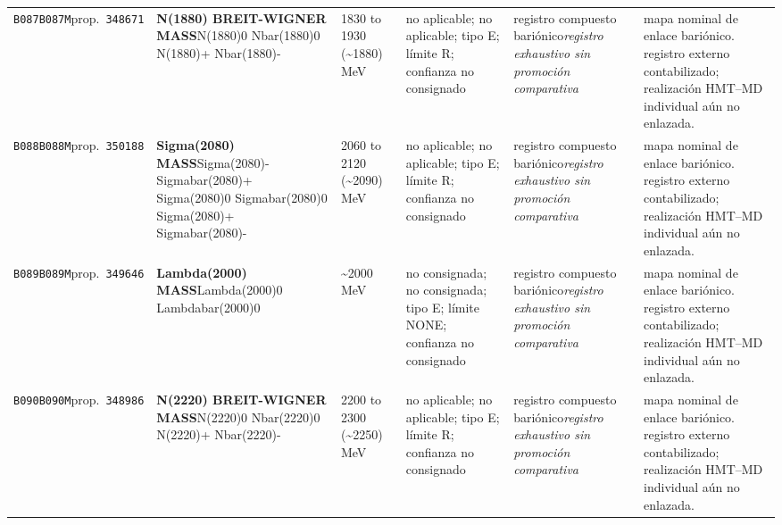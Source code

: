 \begin{landscape}
\begin{longtable}{L{1.85cm}L{4.45cm}L{2.35cm}L{4.05cm}L{3.35cm}L{7.15cm}}
\texttt{B087}\newline \texttt{B087M}\newline prop.\ \texttt{348671} & \textbf{N(1880) BREIT-WIGNER MASS}\newline N(1880)0 \textbar{}\allowbreak{} Nbar(1880)0 \textbar{}\allowbreak{} N(1880)+ \textbar{}\allowbreak{} Nbar(1880)- & 1830 to 1930 (\textasciitilde{}1880)\,MeV & no aplicable; no aplicable; tipo E; límite R; confianza no consignado & registro compuesto bariónico\newline \emph{registro exhaustivo sin promoción comparativa} & mapa nominal de enlace bariónico. registro externo contabilizado; realización HMT--MD individual aún no enlazada. \\
\texttt{B088}\newline \texttt{B088M}\newline prop.\ \texttt{350188} & \textbf{Sigma(2080) MASS}\newline Sigma(2080)- \textbar{}\allowbreak{} Sigmabar(2080)+ \textbar{}\allowbreak{} Sigma(2080)0 \textbar{}\allowbreak{} Sigmabar(2080)0 \textbar{}\allowbreak{} Sigma(2080)+ \textbar{}\allowbreak{} Sigmabar(2080)- & 2060 to 2120 (\textasciitilde{}2090)\,MeV & no aplicable; no aplicable; tipo E; límite R; confianza no consignado & registro compuesto bariónico\newline \emph{registro exhaustivo sin promoción comparativa} & mapa nominal de enlace bariónico. registro externo contabilizado; realización HMT--MD individual aún no enlazada. \\
\texttt{B089}\newline \texttt{B089M}\newline prop.\ \texttt{349646} & \textbf{Lambda(2000) MASS}\newline Lambda(2000)0 \textbar{}\allowbreak{} Lambdabar(2000)0 & \textasciitilde{}2000\,MeV & no consignada; no consignada; tipo E; límite NONE; confianza no consignado & registro compuesto bariónico\newline \emph{registro exhaustivo sin promoción comparativa} & mapa nominal de enlace bariónico. registro externo contabilizado; realización HMT--MD individual aún no enlazada. \\
\texttt{B090}\newline \texttt{B090M}\newline prop.\ \texttt{348986} & \textbf{N(2220) BREIT-WIGNER MASS}\newline N(2220)0 \textbar{}\allowbreak{} Nbar(2220)0 \textbar{}\allowbreak{} N(2220)+ \textbar{}\allowbreak{} Nbar(2220)- & 2200 to 2300 (\textasciitilde{}2250)\,MeV & no aplicable; no aplicable; tipo E; límite R; confianza no consignado & registro compuesto bariónico\newline \emph{registro exhaustivo sin promoción comparativa} & mapa nominal de enlace bariónico. registro externo contabilizado; realización HMT--MD individual aún no enlazada. \\

\end{longtable}
\end{landscape}
